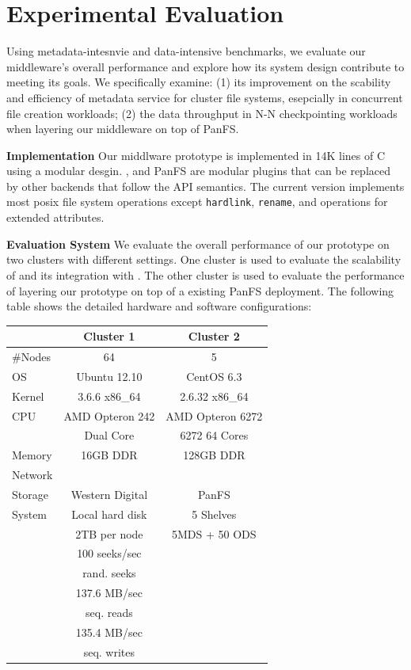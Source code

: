\section{Experimental Evaluation}

Using metadata-intesnvie and data-intensive benchmarks,
we evaluate our middleware's overall performance
and explore how its system design contribute to meeting its goals.
We specifically examine: (1) its improvement on the scability and
efficiency of metadata service for cluster file systems,
esepcially in concurrent file creation workloads;
(2) the data throughput in N-N checkpointing workloads
when layering our middleware on top of PanFS.

\textbf{Implementation }
Our middlware prototype is implemented in 14K lines of C using a modular desgin.
\tfs, \ldb and PanFS are modular plugins that can be replaced by other backends
that follow the API semantics. The current version implements most posix
file system operations except \texttt{hardlink}, \texttt{rename},
and operations for extended attributes.

\textbf{Evaluation System }
We evaluate the overall performance of our prototype
on two clusters with different settings.
One cluster is used to evaluate the scalability of \tfs and its integration with \giga.
The other cluster is used to evaluate the performance of layering our
prototype on top of a existing PanFS deployment.
The following table shows the detailed hardware and software configurations:

\begin{center}
\begin{tabular}{lcc}
\toprule
      & Cluster 1 & Cluster 2 \\
\midrule
\#Nodes & 64  &  5 \\
\hline
OS & Ubuntu 12.10  &   CentOS 6.3  \\
Kernel & 3.6.6 x86\_64 & 2.6.32 x86\_64\\
\hline
CPU & AMD Opteron 242   &  AMD Opteron 6272 \\
    & Dual Core & 6272 64 Cores\\
\hline
Memory & 16GB DDR &  128GB DDR \\
\hline
Network &       &           \\
\hline
Storage & Western Digital &  PanFS\\
System & Local hard disk &      5 Shelves \\
       &  2TB per node &   5MDS + 50 ODS \\
& 100 seeks/sec & \\
& rand. seeks        & \\
& 137.6 MB/sec & \\
& seq. reads      & \\
& 135.4 MB/sec & \\
& seq. writes      & \\
\bottomrule
\end{tabular}
\end{center}

